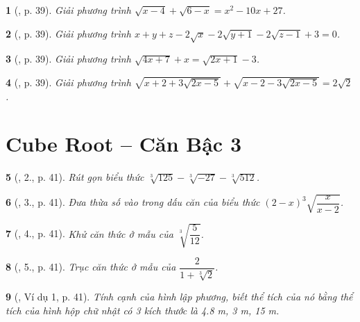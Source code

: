 \documentclass{article}
\newtheorem{baitoan}{}%
\begin{document}
\begin{baitoan}[\cite{Binh_boi_duong_Toan_9_tap_1}, p. 39]
	Giải phương trình $\sqrt{x - 4} + \sqrt{6 - x} = x^2 - 10x + 27$.
\end{baitoan}

\begin{baitoan}[\cite{Binh_boi_duong_Toan_9_tap_1}, p. 39]
	Giải phương trình $x + y + z - 2\sqrt{x} -2\sqrt{y + 1} - 2\sqrt{z - 1} + 3 = 0$.
\end{baitoan}

\begin{baitoan}[\cite{Binh_boi_duong_Toan_9_tap_1}, p. 39]
	Giải phương trình $\sqrt{4x + 7} + x = \sqrt{2x + 1} - 3$.
\end{baitoan}

\begin{baitoan}[\cite{Binh_boi_duong_Toan_9_tap_1}, p. 39]
	Giải phương trình $\sqrt{x + 2 + 3\sqrt{2x - 5}} + \sqrt{x - 2 - 3\sqrt{2x - 5}} = 2\sqrt{2}$.
\end{baitoan}


\section{Cube Root -- Căn Bậc 3}

\begin{baitoan}[\cite{Binh_boi_duong_Toan_9_tap_1}, 2., p. 41]
	Rút gọn biểu thức $\sqrt[3]{125} - \sqrt[3]{-27} - \sqrt[3]{512}$.
\end{baitoan}

\begin{baitoan}[\cite{Binh_boi_duong_Toan_9_tap_1}, 3., p. 41]
	Đưa thừa số vào trong dấu căn của biểu thức $(2 - x)^3 \sqrt{\dfrac{x}{x - 2}}$.
\end{baitoan}

\begin{baitoan}[\cite{Binh_boi_duong_Toan_9_tap_1}, 4., p. 41]
	Khử căn thức ở mẫu của $\sqrt[3]{\dfrac{5}{12}}$.
\end{baitoan}

\begin{baitoan}[\cite{Binh_boi_duong_Toan_9_tap_1}, 5., p. 41]
	Trục căn thức ở mẫu của $\dfrac{2}{1 + \sqrt[3]{2}}$.
\end{baitoan}

\begin{baitoan}[\cite{Binh_boi_duong_Toan_9_tap_1}, Ví dụ 1, p. 41]
	Tính cạnh của hình lập phương, biết thể tích của nó bằng thể tích của hình hộp chữ nhật có 3 kích thước là {\rm4.8 m, 3 m, 15 m}.
\end{baitoan}
\end{document}
